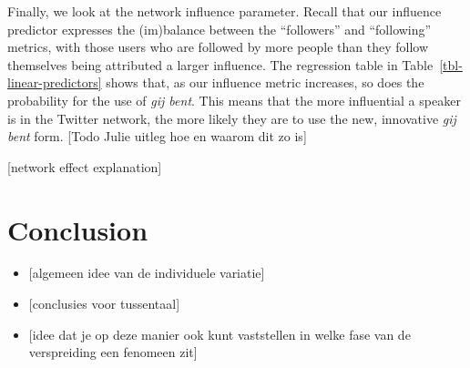 \documentclass[
  letterpaper,
  DIV=11,
  numbers=noendperiod,
  oneside]{scrartcl}
\providecommand{\tightlist}{%
  \setlength{\itemsep}{0pt}\setlength{\parskip}{0pt}}\usepackage{longtable,booktabs,array}
\begin{document}
Finally, we look at the network influence parameter. Recall that our
influence predictor expresses the (im)balance between the ``followers''
and ``following'' metrics, with those users who are followed by more
people than they follow themselves being attributed a larger influence.
The regression table in Table~\ref{tbl-linear-predictors} shows that, as
our influence metric increases, so does the probability for the use of
\emph{gij bent}. This means that the more influential a speaker is in
the Twitter network, the more likely they are to use the new, innovative
\emph{gij bent} form. {[}Todo Julie uitleg hoe en waarom dit zo is{]}

{[}network effect explanation{]}

\section{Conclusion}\label{conclusion}

\begin{itemize}
\tightlist
\item
  {[}algemeen idee van de individuele variatie{]}
\item
  {[}conclusies voor tussentaal{]}
\item
  {[}idee dat je op deze manier ook kunt vaststellen in welke fase van
  de verspreiding een fenomeen zit{]}
\end{itemize}
\end{document}
